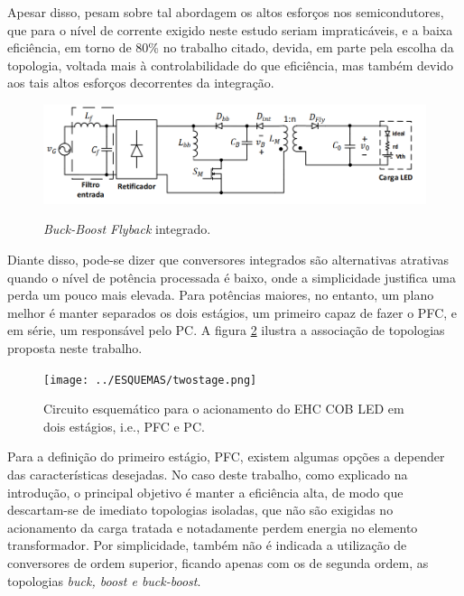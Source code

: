 \documentclass[
        12pt,
        openany, %
        oneside, %
        a4paper,			
        english,			
        brazil
        ]{abntbibufjf}
\begin{document}
Apesar disso, pesam sobre tal abordagem os altos esforços nos semicondutores, que para o nível de corrente exigido neste estudo seriam impraticáveis, e a baixa eficiência, em torno de 80\% no trabalho citado, devida, em parte pela escolha da topologia, voltada mais à controlabilidade do que eficiência, mas também devido aos tais altos esforços decorrentes da integração.

\begin{figure}[h]
	\centering
	\caption{\textit{Buck-Boost Flyback} integrado.}
	\includegraphics[scale=.5]{../ESQUEMAS/integrado_bruno.png}\\
	\label{integrado}
\end{figure}

Diante disso, pode-se dizer que conversores integrados são alternativas atrativas quando o nível de potência processada é baixo, onde a simplicidade justifica uma perda um pouco mais elevada. Para potências maiores, no entanto, um plano melhor é manter separados os dois estágios, um primeiro capaz de fazer o PFC, e em série, um responsável pelo PC. A figura \ref{two-stage-hl} ilustra a associação de topologias proposta neste trabalho.





\begin{figure}[h]
	\centering
	\caption{Circuito esquemático para o acionamento do EHC COB LED em dois estágios, i.e., PFC e PC.}
	\texttt{[image: ../ESQUEMAS/twostage.png]}\\
	\label{two-stage-hl}
\end{figure}

Para a definição do primeiro estágio, PFC, existem algumas opções a depender das características desejadas. No caso deste trabalho, como explicado na introdução, o principal objetivo é manter a eficiência alta, de modo que descartam-se de imediato topologias isoladas, que não são exigidas no acionamento da carga tratada e notadamente perdem energia no elemento transformador. Por simplicidade, também não é indicada a utilização de conversores de ordem superior, ficando apenas com os de segunda ordem, as topologias \textit{buck, boost e buck-boost}.
\end{document}

